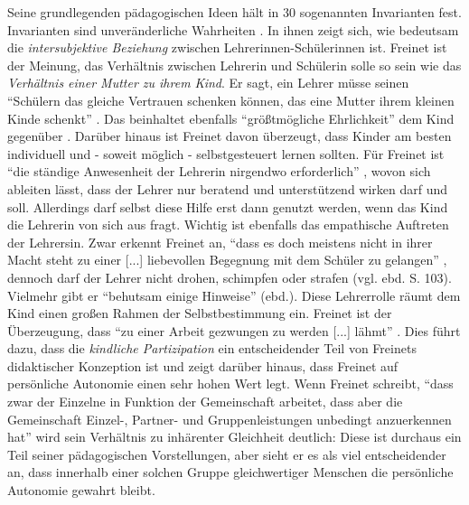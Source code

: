 Seine grundlegenden pädagogischen Ideen hält \citeauthor{Freinet-2000a} in 30 sogenannten Invarianten fest.
Invarianten sind unveränderliche Wahrheiten \parencite[vgl.][S.~488]{Freinet-2000a}.
In ihnen zeigt sich, wie bedeutsam die \emph{intersubjektive Beziehung} zwischen Lehrerinnen-Schülerinnen ist.
Freinet ist der Meinung, das Verhältnis zwischen Lehrerin und Schülerin solle so sein wie das \emph{Verhältnis einer Mutter zu ihrem Kind}.
Er sagt, ein Lehrer müsse seinen ``Schülern das gleiche Vertrauen schenken können, das eine Mutter ihrem kleinen Kinde schenkt'' \parencite[105]{Freinet1979}.
Das beinhaltet ebenfalls ``größtmögliche Ehrlichkeit'' dem Kind gegenüber \parencite[110]{Freinet1979}.
Darüber hinaus ist Freinet davon überzeugt, dass Kinder am besten individuell und - soweit möglich - selbstgesteuert lernen sollten.
Für Freinet ist ``die ständige Anwesenheit der Lehrerin nirgendwo erforderlich'' \parencite[105]{Freinet1979}, wovon sich ableiten lässt, dass der Lehrer nur beratend und unterstützend wirken darf und soll.
Allerdings darf selbst diese Hilfe erst dann genutzt werden, wenn das Kind die Lehrerin von sich aus fragt.
Wichtig ist ebenfalls das empathische Auftreten der Lehrersin.
Zwar erkennt Freinet an, ``dass es doch meistens nicht in ihrer Macht steht zu einer [...] liebevollen Begegnung mit dem Schüler zu gelangen'' \parencite[101]{Freinet1979}, dennoch darf der Lehrer nicht drohen, schimpfen oder strafen (vgl. ebd. S. 103).
Vielmehr gibt er ``behutsam einige Hinweise'' (ebd.).
Diese Lehrerrolle räumt dem Kind einen großen Rahmen der Selbstbestimmung ein.
Freinet ist der Überzeugung, dass ``zu einer Arbeit gezwungen zu werden [...] lähmt'' \parencite[vgl.][S.~495]{Freinet-2000a}.
Dies führt dazu, dass die \emph{kindliche Partizipation} ein entscheidender Teil von Freinets didaktischer Konzeption ist und zeigt darüber hinaus, dass Freinet auf persönliche Autonomie einen sehr hohen Wert legt.
Wenn Freinet schreibt, ``dass zwar der Einzelne in Funktion der Gemeinschaft arbeitet, dass aber die Gemeinschaft Einzel-, Partner- und Gruppenleistungen unbedingt anzuerkennen hat'' \parencite[87]{Freinet1979} wird sein Verhältnis zu inhärenter Gleichheit deutlich:
Diese ist durchaus ein Teil seiner pädagogischen Vorstellungen, aber sieht er es als viel entscheidender an, dass innerhalb einer solchen Gruppe gleichwertiger Menschen die persönliche Autonomie gewahrt bleibt.

